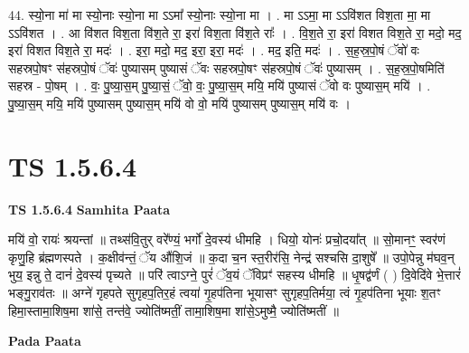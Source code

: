\documentclass[17pt]{extarticle}
\begin{document}
44. स्यो॒ना मा॑ मा स्यो॒नाः स्यो॒ना मा ऽऽमा᳚ स्यो॒नाः स्यो॒ना मा । . मा ऽऽमा॒ मा ऽऽवि॑शत विश॒ता मा॒ मा ऽऽवि॑शत । . आ वि॑शत विश॒ता वि॑श॒ते रा॒ इरा॑ विश॒ता वि॑श॒ते राः᳚ । . वि॒श॒ते रा॒ इरा॑ विशत विश॒ते रा॒ मदो॒ मद॒ इरा॑ विशत विश॒ते रा॒ मदः॑ । . इरा॒ मदो॒ मद॒ इरा॒ इरा॒ मदः॑ । . मद॒ इति॒ मदः॑ । . स॒ह॒स्र॒पो॒षं ॅवो॑ वः सहस्रपो॒षꣳ स॑हस्रपो॒षं ॅवः॑ पुष्यासम् पुष्यासं ॅवः सहस्रपो॒षꣳ स॑हस्रपो॒षं ॅवः॑ पुष्यासम् । . स॒ह॒स्र॒पो॒षमिति॑ सहस्र - पो॒षम् । . वः॒ पु॒ष्या॒स॒म् पु॒ष्या॒सं॒ ॅवो॒ वः॒ पु॒ष्या॒स॒म् मयि॒ मयि॑ पुष्यासं ॅवो वः पुष्यास॒म् मयि॑ । . पु॒ष्या॒स॒म् मयि॒ मयि॑ पुष्यासम् पुष्यास॒म् मयि॑ वो वो॒ मयि॑ पुष्यासम् पुष्यास॒म् मयि॑ वः । \newline
\pagebreak
{}

\section{ TS 1.5.6.4 }

\textbf{TS 1.5.6.4 } \newline
\textbf{Samhita Paata} \newline

मयि॑ वो॒ रायः॑ श्रयन्तां ॥ तथ्स॑वि॒तुर् वरे᳚ण्यं॒ भर्गो॑ दे॒वस्य॑ धीमहि । धियो॒ योनः॑ प्रचो॒दया᳚त् ॥ सो॒मानꣳ॒॒ स्वर॑णं कृणु॒हि ब्र॑ह्मणस्पते । क॒क्षीव॑न्तं॒ ॅय औ॑शि॒जं ॥ क॒दा च॒न स्त॒रीर॑सि॒ नेन्द्र॑ सश्चसि दा॒शुषे᳚ ॥ उपो॒पेन्नु म॑घव॒न् भुय॒ इन्नु ते॒ दानं॑ दे॒वस्य॑ पृच्यते ॥ परि॑ त्वाऽग्ने॒ पुरं॑ ॅव॒यं ॅविप्रꣳ॑ सहस्य धीमहि ॥ धृ॒षद्व॑र्णं ( ) दि॒वेदि॑वे भे॒त्तारं॑ भङ्गु॒राव॑तः ॥ अग्ने॑ गृहपते सुगृहप॒तिर॒हं त्वया॑ गृ॒हप॑तिना भूयासꣳ सुगृहप॒तिर्मया॒ त्वं गृ॒हप॑तिना भूयाः श॒तꣳ हिमा॒स्तामा॒शिष॒मा शा॑से॒ तन्त॑वे॒ ज्योति॑ष्मतीं॒ तामा॒शिष॒मा शा॑से॒ऽमुष्मै॒ ज्योति॑ष्मतीं ॥ \newline

\textbf{Pada Paata} \newline
\end{document}

